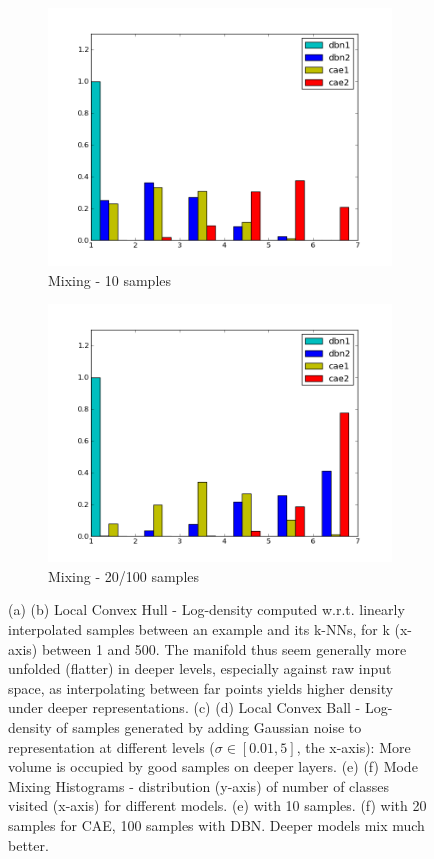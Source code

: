 \begin{figure}
\begin{subfigure}{.45\textwidth}
\includegraphics[width=1.\textwidth]{article3/images/tfd_sub0.png}
\caption{Mixing - 10 samples}
\end{subfigure}
\begin{subfigure}{.45\textwidth}
\includegraphics[width=1.\textwidth]{article3/images/tfd_sub1.png}
\caption{Mixing - 20/100 samples}
\end{subfigure}

\caption{ (a) (b) Local Convex Hull - Log-density computed w.r.t. linearly
interpolated samples between an example and its k-NNs, for k (x-axis)
between 1 and 500. The manifold thus seem generally more unfolded (flatter)
in deeper levels, especially against raw input space,
as interpolating between far points yields higher density
under deeper representations.
(c) (d) Local Convex Ball -
Log-density of samples generated by adding Gaussian noise to representation
at different levels ($\sigma\in[0.01,5]$, the x-axis): More volume is
occupied by good samples on
deeper layers. (e) (f) Mode Mixing Histograms - distribution (y-axis)
of number of classes visited (x-axis) for different
models. (e) with 10 samples. (f) with 20 samples for CAE, 100 samples with DBN. Deeper
models mix much better.}
\label{fig:entropy}
\end{figure}


